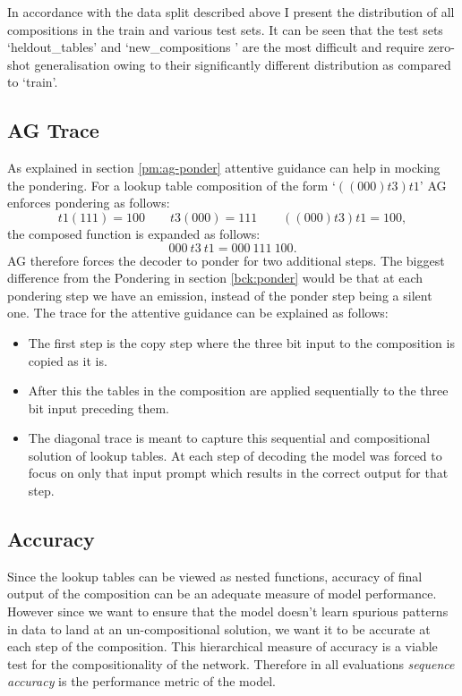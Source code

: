 In accordance with the data split described above I present the distribution of all compositions in the train and various test sets. It can be seen that the test sets \lq heldout\_tables\rq{} and \lq new\_compositions \rq{} are the most difficult and require zero-shot generalisation owing to their significantly different distribution as compared to \lq train\rq{}.

\subsection{AG Trace}\label{lt:ponder}
As explained in section \ref{pm:ag-ponder} attentive guidance can help in mocking the pondering. For a lookup table composition of the form \lq $((000)t3)t1$\rq{} AG enforces pondering as follows:
\begin{equation}
t1(111) = 100 \qquad t3(000) = 111 \qquad ((000)t3)t1 = 100,
\end{equation}
the composed function is expanded as follows:
\begin{equation}
000\ t3\ t1 = 000\ 111\ 100.
\end{equation}
AG therefore forces the decoder to ponder for two additional steps. The biggest difference from the Pondering in section \ref{bck:ponder} would be that at each pondering step we have an emission, instead of the ponder step being a silent one. The trace for the attentive guidance can be explained as follows:
\begin{itemize}
	\item The first step is the copy step where the three bit input to the composition is copied as it is.
	\item After this the tables in the composition are applied sequentially to the three bit input preceding them.
	\item The diagonal trace is meant to capture this sequential and compositional solution of lookup tables. At each step of decoding the model was forced to focus on only that input prompt which results in the correct output for that step.
\end{itemize}


\subsection{Accuracy}
Since the lookup tables can be viewed as nested functions, accuracy of final output of the composition can be an adequate measure of model performance. However since we want to ensure that the model doesn't learn spurious patterns in data to land at an un-compositional solution, we want it to be accurate at each step of the composition. This hierarchical measure of accuracy is a viable test for the compositionality of the network. Therefore in all evaluations \textit{sequence accuracy} is the performance metric of the model.

